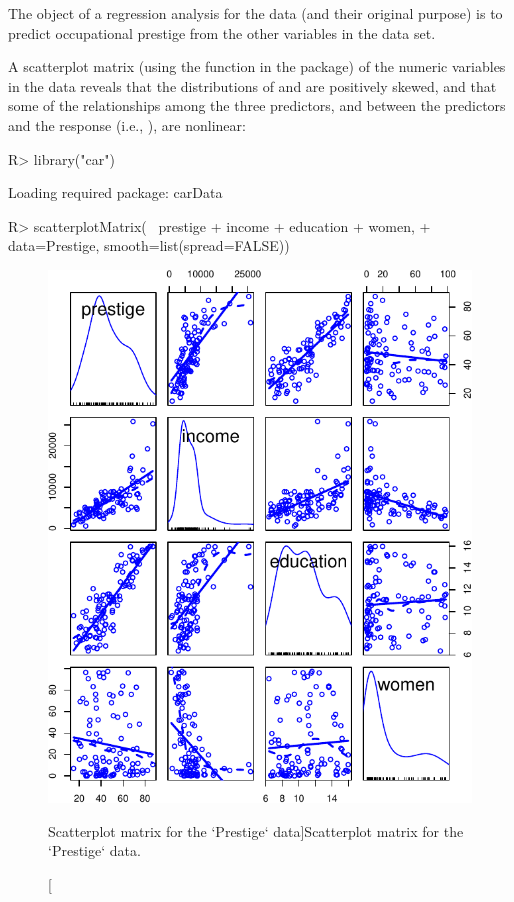 \documentclass[
]{jss}
\begin{document}
The object of a regression analysis for the  data (and
their original purpose) is to predict occupational prestige from the
other variables in the data set.

A scatterplot matrix (using the  function in
the  package) of the numeric variables in the data reveals that
the distributions of  and  are positively
skewed, and that some of the relationships among the three predictors,
and between the predictors and the response (i.e., ), are
nonlinear:

\begin{CodeChunk}
\begin{CodeInput}
R> library("car")
\end{CodeInput}
\begin{CodeOutput}
Loading required package: carData
\end{CodeOutput}
\begin{CodeInput}
R> scatterplotMatrix(~ prestige + income + education + women,
+                   data=Prestige, smooth=list(spread=FALSE))
\end{CodeInput}
\begin{figure}

{\centering \includegraphics[width=1\linewidth]{JSS-article_files/figure-latex/scatterplot-matrix-1} 

}

\caption[Scatterplot matrix for the `Prestige` data]{Scatterplot matrix for the `Prestige` data.}\label{fig:scatterplot-matrix}
\end{figure}
\end{CodeChunk}
\end{document}
